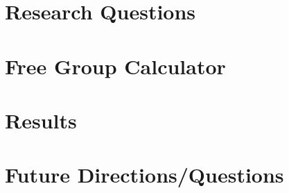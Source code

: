 \documentclass[12pt,reqno]{amsart}
\theoremstyle{plain}
\theoremstyle{definition}
\numberwithin{theorem}{section}
\numberwithin{exercise}{section}
\let\ssection=\section
\renewcommand{\section}{\setcounter{equation}{0}\ssection}
\begin{document}

\section{Research Questions}\label{sec:questions}


\section{Free Group Calculator}\label{sec:fgc}


\section{Results}\label{sec:results}


\section{Future Directions/Questions}\label{sec:future}

\end{document}
